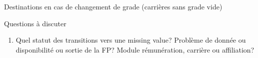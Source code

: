 \documentclass[11pt,a4paper]{article}
\begin{document}
\begin{table}[htbp]
    \label{tab:purged_destination}
    \centering
    \caption{Destinations en cas de changement de grade (carrières sans grade vide)} 
    
\end{table}

Questions à discuter
\begin{enumerate}[leftmargin=1cm ,parsep=0cm,itemsep=0cm,topsep=0cm] 
\item Quel statut des transitions vers une missing value? Problème de donnée ou disponibilité ou sortie de la FP? Module rémunération, carrière ou affiliation? 
\end{enumerate}




\ifx\isEmbedded\undefined
\newpage
 

\end{document}
